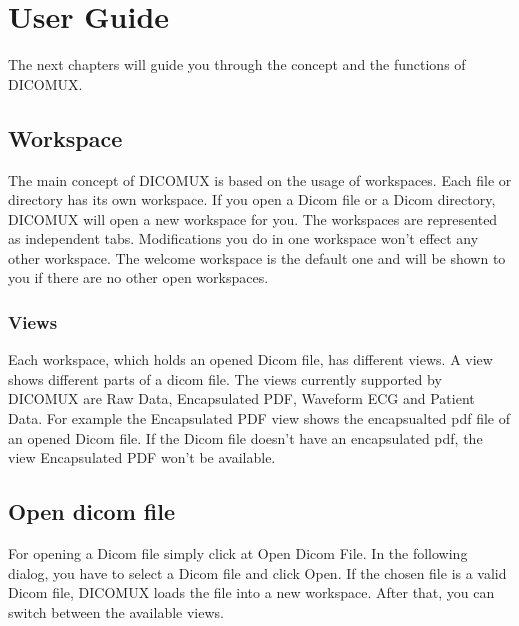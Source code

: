 %
%
\chapter{User Guide}
	The next chapters will guide you through the concept and the functions of DICOMUX.

\section{Workspace}
	The main concept of DICOMUX is based on the usage of workspaces. Each file or directory has its
	own workspace. If you open a Dicom file or a Dicom directory, DICOMUX will open a new workspace for
	you. The workspaces are represented as independent tabs. Modifications you do in one workspace won't    		effect any other workspace. The welcome workspace is the default one and will be shown to you
	if there are no other open workspaces.\\
	
	\begin{minipage}{\textwidth}
	\centering
	\end{minipage}

	
	\subsection{Views}
		Each workspace, which holds an opened Dicom file, has different views. A view shows
		different parts of a dicom file. The views currently supported by DICOMUX are Raw Data, Encapsulated 			PDF, Waveform ECG and Patient Data. For example the Encapsulated PDF view shows the encapsualted pdf 		file of	an opened Dicom file. If the Dicom file doesn't have an encapsulated pdf, the view
		Encapsulated PDF won't be available.\\
	
		\begin{minipage}{\textwidth} 
		\centering
		\label{fig:bild}
		\end{minipage}

\section{Open dicom file}
	For opening a Dicom file simply click at Open Dicom File. In the following dialog, you have to select a 		Dicom file and click Open. If the chosen file is a valid Dicom file, DICOMUX loads the file into a new
	workspace. After that, you can switch between the available views.\\

